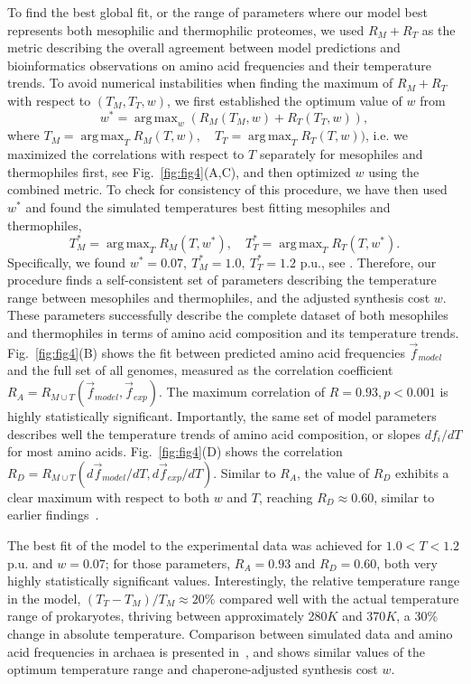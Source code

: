 \documentclass[10pt,letterpaper]{article}
\DeclareMathOperator*{\argmax}{arg\,max}
\begin{document}
To find the best global fit, or the range of parameters where our model best represents both mesophilic and thermophilic proteomes, we used $R_M + R_T$ as the metric describing the overall agreement between model predictions and bioinformatics observations on amino acid frequencies and their temperature trends. To avoid numerical instabilities when finding the maximum of $R_M+R_T$ with respect to $(T_M, T_T, w)$, we first established the optimum value of $w$ from
\begin{equation}
	\label{optimal_w_definition}
	w^* = \argmax_{w} ( R_M(T_M, w) + R_T(T_T,w) ),
\end{equation}
where $T_M=\argmax_{T}R_M(T,w), \quad T_T=\argmax_{T}R_T(T,w))$, i.e. we maximized the correlations with respect to $T$ separately for mesophiles and thermophiles first, see Fig.~\ref{fig:fig4}(A,C), and then optimized $w$ using the combined metric. To check for consistency of this procedure, we have then used $w^*$ and found the simulated temperatures best fitting mesophiles and thermophiles, 
\begin{equation}
	\label{optimal_T_range}
	T^*_M = \argmax_{T}R_M(T, w^*), \quad T^*_T = \argmax_{T}R_T(T, w^*).
\end{equation}
Specifically, we found $w^*=0.07,\  T^*_M=1.0,\ T^*_T=1.2$ p.u., see . Therefore, our procedure finds a self-consistent set of parameters describing the temperature range between mesophiles and thermophiles, and the adjusted synthesis cost $w$. These parameters successfully describe the complete dataset of both mesophiles and thermophiles in terms of amino acid composition and its temperature trends. Fig.~\ref{fig:fig4}(B) shows the fit between predicted amino acid frequencies $\vec f_{model}$ and the full set of all genomes, measured as the correlation coefficient $R_A = R_{M \cup T}(\vec f_{model}, \vec f_{exp})$. The maximum correlation of $R=0.93, p<0.001$ is highly statistically significant. Importantly, the same set of model parameters describes well the temperature trends of amino acid composition, or slopes $df_i/dT$ for most amino acids. Fig.~\ref{fig:fig4}(D) shows the correlation $R_D = R_{M\cup T}(d\vec f_{model}{/dT}, d\vec f_{exp}/dT)$. Similar to $R_A$, the value of $R_D$ exhibits a clear maximum with respect to both $w$ and $T$, reaching $R_D\approx0.60$, similar to earlier findings~\cite{Venev2015Massively}.

The best fit of the model to the experimental data was achieved for $1.0<T<1.2$ p.u. and $w=0.07$; for those parameters, $R_A=0.93$ and $R_D=0.60$, both very highly statistically significant values. Interestingly, the relative temperature range in the model, $(T_T-T_M)/T_M\approx 20\%$ compared well with the actual temperature range of prokaryotes, thriving between approximately 280$K$ and 370$K$, a 30\% change in absolute temperature. Comparison between simulated data and amino acid frequencies in archaea is presented in~, and shows similar values of the optimum temperature range and chaperone-adjusted synthesis cost $w$.
\end{document}
